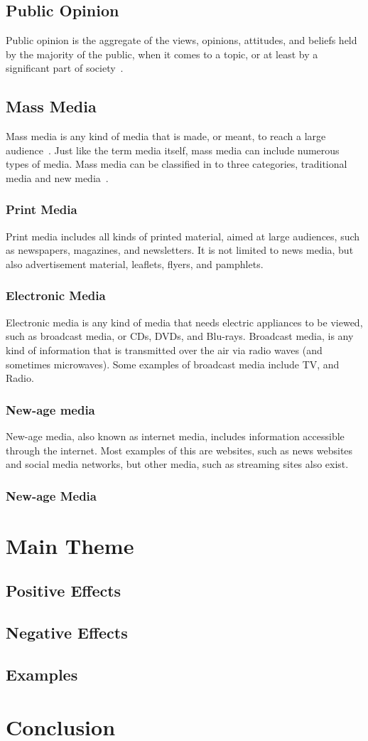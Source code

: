 \documentclass[a4paper,12pt]{article}
\begin{document}
\subsection{Public Opinion}
Public opinion is the aggregate of the views, opinions, attitudes, and beliefs held by the majority of the public,
when it comes to a topic, or at least by a significant part of society~\parencite{davison2024public}.
\subsection{Mass Media}
Mass media is any kind of media that is made, or meant, to reach a large audience~\parencite{duignan2024mass}.
Just like the term media itself, mass media can include numerous types of media.
Mass media can be classified in to three categories, traditional media and new media~\parencite{manohar2008different}.
\subsubsection{Print Media}
Print media includes all kinds of printed material, aimed at large audiences, such as newspapers, magazines, and newsletters.
It is not limited to news media, but also advertisement material, leaflets, flyers, and pamphlets.
\subsubsection{Electronic Media}
Electronic media is any kind of media that needs electric appliances to be viewed, such as broadcast media, or CDs, DVDs, and Blu-rays.
Broadcast media, is any kind of information that is transmitted over the air via radio waves (and sometimes microwaves).
Some examples of broadcast media include TV, and Radio.
\subsubsection{New-age media}
New-age media, also known as internet media, includes information accessible through the internet.
Most examples of this are websites, such as news websites and social media networks, but other media, such as streaming sites also exist.

\subsubsection{New-age Media}

\section{Main Theme}
\subsection{Positive Effects}
\subsection{Negative Effects}
\subsection{Examples}

\section{Conclusion}

\newpage
\printbibliography
\end{document}
